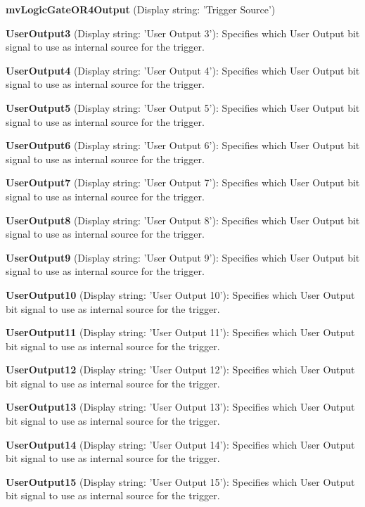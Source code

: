 \begin{DoxyItemize}
\item {\bfseries mv\+Logic\+Gate\+O\+R4\+Output} (Display string\+: 'Trigger Source')
\item {\bfseries User\+Output3} (Display string\+: 'User Output 3')\+: Specifies which User Output bit signal to use as internal source for the trigger.
\item {\bfseries User\+Output4} (Display string\+: 'User Output 4')\+: Specifies which User Output bit signal to use as internal source for the trigger.
\item {\bfseries User\+Output5} (Display string\+: 'User Output 5')\+: Specifies which User Output bit signal to use as internal source for the trigger.
\item {\bfseries User\+Output6} (Display string\+: 'User Output 6')\+: Specifies which User Output bit signal to use as internal source for the trigger.
\item {\bfseries User\+Output7} (Display string\+: 'User Output 7')\+: Specifies which User Output bit signal to use as internal source for the trigger.
\item {\bfseries User\+Output8} (Display string\+: 'User Output 8')\+: Specifies which User Output bit signal to use as internal source for the trigger.
\item {\bfseries User\+Output9} (Display string\+: 'User Output 9')\+: Specifies which User Output bit signal to use as internal source for the trigger.
\item {\bfseries User\+Output10} (Display string\+: 'User Output 10')\+: Specifies which User Output bit signal to use as internal source for the trigger.
\item {\bfseries User\+Output11} (Display string\+: 'User Output 11')\+: Specifies which User Output bit signal to use as internal source for the trigger.
\item {\bfseries User\+Output12} (Display string\+: 'User Output 12')\+: Specifies which User Output bit signal to use as internal source for the trigger.
\item {\bfseries User\+Output13} (Display string\+: 'User Output 13')\+: Specifies which User Output bit signal to use as internal source for the trigger.
\item {\bfseries User\+Output14} (Display string\+: 'User Output 14')\+: Specifies which User Output bit signal to use as internal source for the trigger.
\item {\bfseries User\+Output15} (Display string\+: 'User Output 15')\+: Specifies which User Output bit signal to use as internal source for the trigger.

\end{DoxyItemize}
